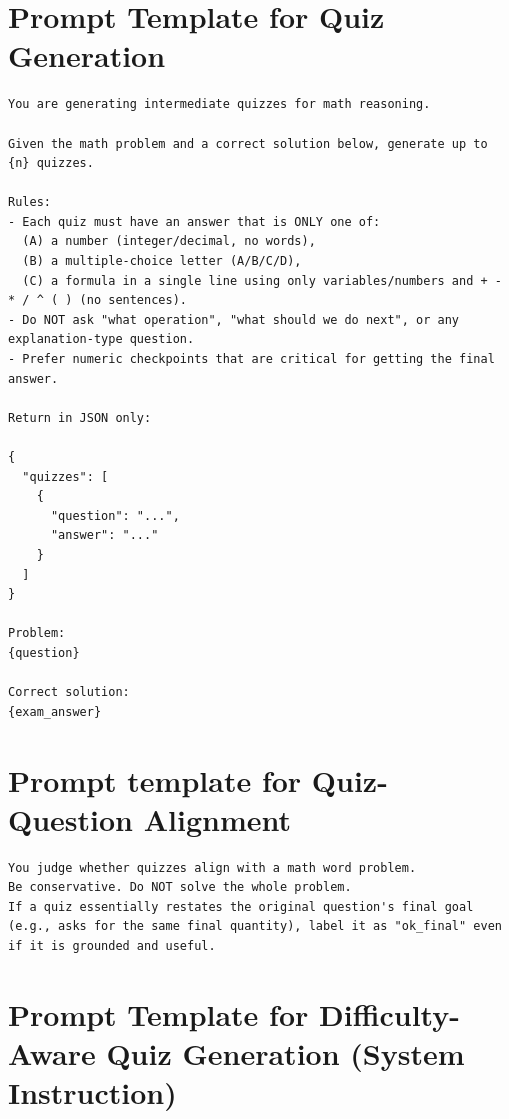 \documentclass[12pt]{report}
\begin{document}
\section{Prompt Template for Quiz Generation}
\label{app:quiz-generation-prompt}

\begin{lstlisting}
You are generating intermediate quizzes for math reasoning.

Given the math problem and a correct solution below, generate up to {n} quizzes.

Rules:
- Each quiz must have an answer that is ONLY one of:
  (A) a number (integer/decimal, no words),
  (B) a multiple-choice letter (A/B/C/D),
  (C) a formula in a single line using only variables/numbers and + - * / ^ ( ) (no sentences).
- Do NOT ask "what operation", "what should we do next", or any explanation-type question.
- Prefer numeric checkpoints that are critical for getting the final answer.

Return in JSON only:

{
  "quizzes": [
    {
      "question": "...",
      "answer": "..."
    }
  ]
}

Problem:
{question}

Correct solution:
{exam_answer}
\end{lstlisting}

\section{Prompt template for Quiz-Question Alignment}
\label{app:quiz-question-alignment}

\begin{lstlisting}
You judge whether quizzes align with a math word problem.
Be conservative. Do NOT solve the whole problem.
If a quiz essentially restates the original question's final goal 
(e.g., asks for the same final quantity), label it as "ok_final" even if it is grounded and useful.
\end{lstlisting}

\section{Prompt Template for Difficulty-Aware Quiz Generation (System Instruction)}
\label{app:quiz-gen-v2-system}
\end{document}
